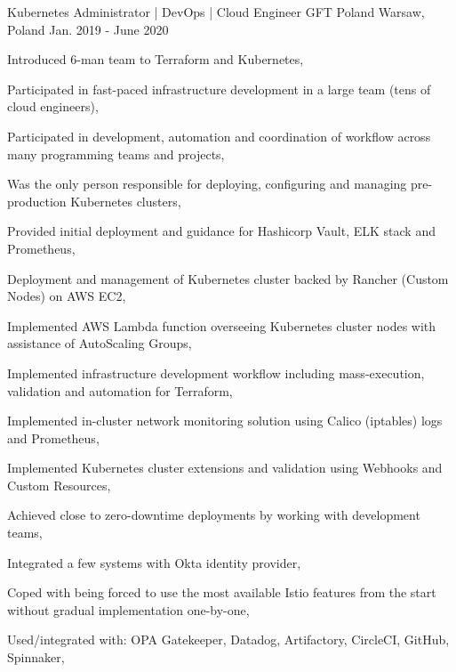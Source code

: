 \begin{cventries}
  \cventry
  {Kubernetes Administrator | DevOps | Cloud Engineer} %
  {GFT Poland} %
  {Warsaw, Poland} %
  {Jan. 2019 - June 2020} %
  {
    \begin{cvitems} %
      \item {Introduced 6-man team to Terraform and Kubernetes,}
      \item {Participated in fast-paced infrastructure development in a large team (tens of cloud engineers),}
      \item {Participated in development, automation and coordination of workflow across many programming teams and projects,}
      \item {Was the only person responsible for deploying, configuring and managing pre-production Kubernetes clusters,}
      \item {Provided initial deployment and guidance for Hashicorp Vault, ELK stack and Prometheus,}
      \item {Deployment and management of Kubernetes cluster backed by Rancher (Custom Nodes) on AWS EC2,}
      \item {Implemented AWS Lambda function overseeing Kubernetes cluster nodes with assistance of AutoScaling Groups,}
      \item {Implemented infrastructure development workflow including mass-execution, validation and automation for Terraform,}
      \item {Implemented in-cluster network monitoring solution using Calico (iptables) logs and Prometheus,}
      \item {Implemented Kubernetes cluster extensions and validation using Webhooks and Custom Resources,}
      \item {Achieved close to zero-downtime deployments by working with development teams,}
      \item {Integrated a few systems with Okta identity provider,}
      \item {Coped with being forced to use the most available Istio features from the start without gradual implementation one-by-one,}
      \item {Used/integrated with: OPA Gatekeeper, Datadog, Artifactory, CircleCI, GitHub, Spinnaker,}
    \end{cvitems}
  }


\end{cventries}
